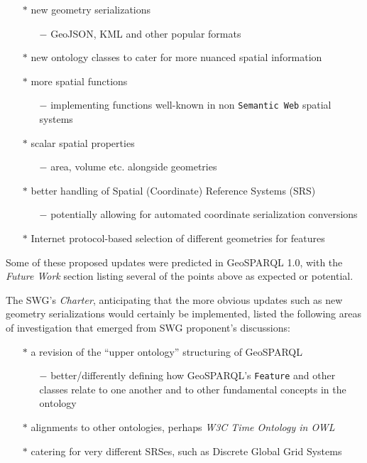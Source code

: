 \documentclass[runningheads]{llncs}
\begin{document}
\begin{itemize}
    \item[$\ast$] new geometry serializations
    \begin{itemize}
        \item[$-$] GeoJSON, KML and other popular formats
    \end{itemize} 
    \item[$\ast$] new ontology classes to cater for more nuanced spatial information
    \item[$\ast$] more spatial functions
    \begin{itemize}
        \item[$-$] implementing functions well-known in non \texttt{Semantic Web} spatial systems
    \end{itemize} 
    \item[$\ast$] scalar spatial properties 
    \begin{itemize}
        \item[$-$] area, volume etc. alongside geometries
    \end{itemize} 
    \item[$\ast$] better handling of Spatial (Coordinate) Reference Systems (SRS)
    \begin{itemize}
        \item[$-$] potentially allowing for automated coordinate serialization conversions
    \end{itemize} 
    \item[$\ast$] Internet protocol-based selection of different geometries for features
\end{itemize}

Some of these proposed updates were predicted in GeoSPARQL 1.0, with the \textit{Future Work} section listing several of the 
points above as expected or potential.

The SWG's \textit{Charter}, anticipating that the more obvious updates such as new geometry serializations would certainly
be implemented, listed the following areas of investigation that emerged from SWG proponent's discussions:

\begin{itemize}
    \item[$\ast$] a revision of the ``upper ontology'' structuring of GeoSPARQL
    \begin{itemize}
        \item[$-$] better/differently defining how GeoSPARQL's \texttt{Feature} and other classes relate to one another and to other fundamental concepts in the ontology
    \end{itemize} 
    \item[$\ast$] alignments to other ontologies, perhaps \textit{W3C Time Ontology in OWL}~\cite{simon_cox_time_2017}
    \item[$\ast$] catering for very different SRSes, such as Discrete Global Grid Systems
\end{itemize}
\end{document}
